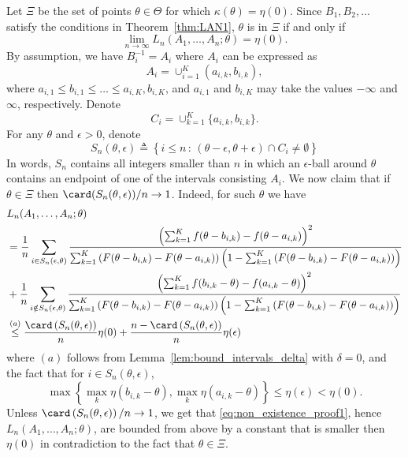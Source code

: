 Let $\Xi$ be the set of points $\theta \in \Theta$ for which $\kappa(\theta) = \eta(0)$. 
%
Since $B_1,B_2,\ldots$ satisfy the conditions in Theorem~\ref{thm:LAN1}, $\theta$ is in $\Xi$ if and only if
\begin{equation}
\label{eq:non_existence_proof}
\lim_{n\to \infty} L_n(A_1,\ldots,A_n;\theta) = \eta(0). 
\end{equation}
By assumption, we have $B_i^{-1} = A_i$ where $A_i$ can be expressed as
\[
A_i = \cup_{i=1}^K (a_{i,k},b_{i,k}), 
\]
where $a_{i,1} \leq b_{i,1} \leq \ldots \leq a_{i,K}, b_{i,K}$, and $a_{i,1}$ and $b_{i,K}$ may take the values $-\infty$ and $\infty$, respectively. Denote
\[
C_i = \cup_{k=1}^{K}\{a_{i,k},b_{i,k}\}.
\]
For any $\theta$ and $\epsilon>0$, denote 
\[
S_n(\theta, \epsilon) \triangleq \left\{ i\leq n \,:\, (\theta-\epsilon,\theta+\epsilon) \cap C_i \neq \emptyset \right\}
\]
In words, $S_n$ contains all integers smaller than $n$ in which an $\epsilon$-ball around $\theta$ contains an endpoint of one of the intervals consisting $A_i$. 
%
We now claim that 
if $\theta \in \Xi$ then $\card(S_n(\theta, \epsilon))/n \to 1$. Indeed, for such $\theta$ we have
\begin{align}
& L_n(A_1,\ldots,A_n; \theta) \nonumber \\
& = \frac{1}{n} \sum_{i \in S_n(\epsilon,\theta)}  
\frac{ \left(\sum_{k=1}^{K}  f(\theta - b_{i,k})- f(\theta - a_{i,k}) \right)^2}{ \sum_{k=1}^{K} \left( F(\theta - b_{i,k})- F(\theta - a_{i,k}) \right) \left(1-\sum_{k=1}^{K} \left( F(\theta - b_{i,k})- F(\theta - a_{i,k}) \right)\right)} \nonumber \\
& 
+ \frac{1}{n}\sum_{i \notin S_n(\epsilon,\theta) } \frac{ \left(\sum_{k=1}^{K}  f(b_{i,k}-\theta) - f(a_{i,k}-\theta) \right)^2} { \sum_{k=1}^{K} \left( F(\theta - b_{i,k})- F(\theta - a_{i,k}) \right) \left(1-\sum_{k=1}^{K} \left( F(\theta - b_{i,k})- F(\theta - a_{i,k}) \right)\right)} \nonumber \\
& \overset{(a)}{\leq}
\frac{\card\left(S_n(\theta,\epsilon)\right)}{n} \eta(0) + \frac{n-\card\left(S_n(\theta,\epsilon) \right) }{n} \eta(\epsilon) 
 \label{eq:non_existence_proof1}
\end{align}
where $(a)$ follows from Lemma~\ref{lem:bound_intervals_delta} with $\delta =0$, and the fact that for $i \in S_n(\theta, \epsilon)$, 
\[
\max\left\{ \max_k \eta(b_{i,k}-\theta) , \max_k \eta(a_{i,k}-\theta)  \right\} \leq \eta(\epsilon) < \eta(0). 
\]
Unless  $\card \left(S_n(\theta, \epsilon) \right)/n \to 1$, we get that \eqref{eq:non_existence_proof1}, hence $L_n(A_1,\ldots,A_n ; \theta)$, are bounded from above by a constant that is smaller then $\eta(0)$ in contradiction to the fact that $\theta \in \Xi$. \par
